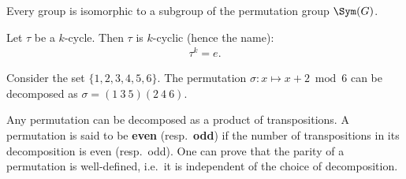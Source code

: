     \begin{theorem}[Cayley]
        Every group is isomorphic to a subgroup of the permutation group $\Sym(G)$.
    \end{theorem}

    \begin{property}
        Let $\tau$ be a $k$-cycle. Then $\tau$ is $k$-cyclic (hence the name):
        \begin{gather}
            \tau^k = e.
        \end{gather}
    \end{property}
    \begin{example}
        Consider the set $\{1,2,3,4,5,6\}$. The permutation $\sigma:x\mapsto x+2\bmod6$ can be decomposed as $\sigma = (1\ 3\ 5)(2\ 4\ 6)$.
    \end{example}

    \begin{property}[Decomposition]
        Any permutation can be decomposed as a product of transpositions. A permutation is said to be \textbf{even} (resp.~\textbf{odd}) if the number of transpositions in its decomposition is even (resp.~odd). One can prove that the parity of a permutation is well-defined, i.e.~it is independent of the choice of decomposition.
    \end{property}


